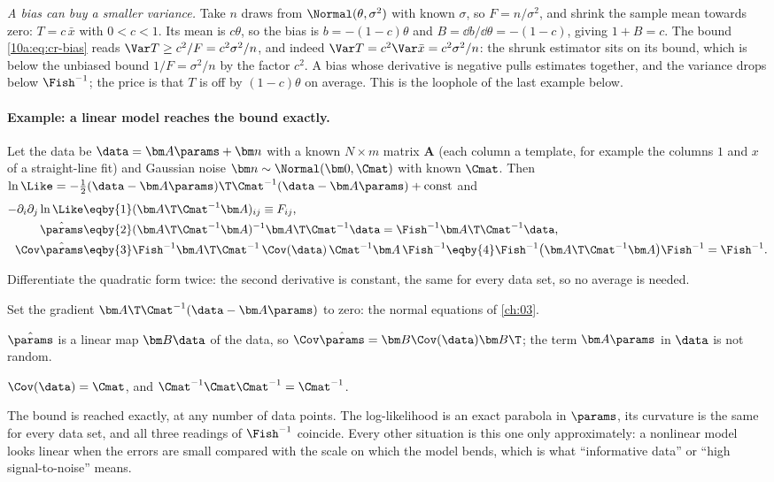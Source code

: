 \emph{A bias can buy a smaller variance.} Take $n$ draws from $\Normal(\theta,\sigma^2)$ with known $\sigma$, so
$F=n/\sigma^2$, and shrink the sample mean towards zero: $T=c\,\bar x$ with $0<c<1$. Its mean is $c\theta$, so the bias
is $b=-(1-c)\theta$ and $B=\dd b/\dd\theta=-(1-c)$, giving $1+B=c$. The bound \eqref{10a:eq:cr-bias} reads
$\Var T\ge c^2/F=c^2\sigma^2/n$, and indeed $\Var T=c^2\Var\bar x=c^2\sigma^2/n$: the shrunk estimator sits on its
bound, which is below the unbiased bound $1/F=\sigma^2/n$ by the factor $c^2$. A bias whose derivative is
negative pulls estimates together, and the variance drops below $\Fish^{-1}$; the price is that $T$ is off
by $(1-c)\theta$ on average. This is the loophole of the last example below.

\paragraph{Example: a linear model reaches the bound exactly.} Let the data be $\data=\bm A\params+\bm n$
with a known $N\times m$ matrix $\bm A$ (each column a template, for example the columns $1$ and $x$ of a
straight-line fit) and Gaussian noise $\bm n\sim\Normal(\bm0,\Cmat)$ with known $\Cmat$. Then
$\ln\Like=-\tfrac12(\data-\bm A\params)\T\Cmat^{-1}(\data-\bm A\params)+\text{const}$ and
\begin{align*}
  -\partial_i\partial_j\ln\Like
  &\eqby{1}(\bm A\T\Cmat^{-1}\bm A)_{ij}\equiv F_{ij},
  \\
  \hat\params&\eqby{2}(\bm A\T\Cmat^{-1}\bm A)^{-1}\bm A\T\Cmat^{-1}\data=\Fish^{-1}\bm A\T\Cmat^{-1}\data,
  \\
  \Cov\hat\params
  &\eqby{3}\Fish^{-1}\bm A\T\Cmat^{-1}\,\Cov(\data)\,\Cmat^{-1}\bm A\,\Fish^{-1}
  \eqby{4}\Fish^{-1}\bigl(\bm A\T\Cmat^{-1}\bm A\bigr)\Fish^{-1}
  =\Fish^{-1}.
\end{align*}
\begin{explain}
  \item Differentiate the quadratic form twice: the second derivative is constant, the same for every data
        set, so no average is needed.
  \item Set the gradient $\bm A\T\Cmat^{-1}(\data-\bm A\params)$ to zero: the normal equations of
        \cref{ch:03}.
  \item $\hat\params$ is a linear map $\bm B\data$ of the data, so $\Cov\hat\params=\bm B\Cov(\data)\bm B\T$;
        the term $\bm A\params$ in $\data$ is not random.
  \item $\Cov(\data)=\Cmat$, and $\Cmat^{-1}\Cmat\Cmat^{-1}=\Cmat^{-1}$.
\end{explain}
The bound is reached exactly, at any number of data points. The log-likelihood is an exact parabola in
$\params$, its curvature is the same for every data set, and all three readings of $\Fish^{-1}$ coincide.
Every other situation is this one only approximately: a nonlinear model looks linear when the errors are
small compared with the scale on which the model bends, which is what ``informative data'' or ``high
signal-to-noise'' means.

